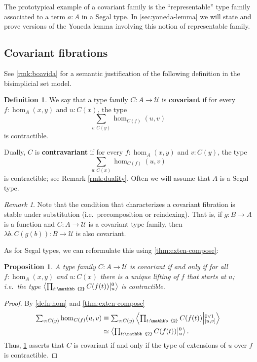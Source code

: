 \documentclass[12pt]{amsart}
\theoremstyle{plain}
\newtheorem{prop}[thm]{Proposition}
\theoremstyle{definition}
\newtheorem{defn}[thm]{Definition}
\theoremstyle{remark}
\newtheorem{rmk}[thm]{Remark}
\numberwithin{equation}{section}
\newcommand{\tsum}{\textstyle\sum}
\newcommand{\exten}[4]{\left\langle\mathchoice{\textstyle\prod_{#1}}{\textstyle\prod_{#1}}{\scriptstyle\prod_{#1}}{\scriptscriptstyle\prod_{#1}} #2 \middle|^{#3}_{#4}\right\rangle}
\newcommand{\jdeq}{\equiv}
\newcommand{\univtype}{\mathcal{U}}
\newcommand{\lam}[1]{\lambda #1.\,}
\newcommand{\two}{\mathbb{2}}
\begin{document}
The prototypical example of a covariant family is the ``representable'' type family associated to a term $a : A$ in a Segal type.
In \cref{sec:yoneda-lemma} we will state and prove versions of the Yoneda lemma involving this notion of representable family.

\subsection{Covariant fibrations}

See \cref{rmk:boavida} for a semantic justification of the following definition in the bisimplicial set model.

\begin{defn}\label{defn:covariant-family}
  We say that a type family $C:A\to\univtype$ is \textbf{covariant} if for every $f:\hom_A(x,y)$ and $u:C(x)$, the type \[\sum_{v:C(y)} \hom_{C(f)}(u,v)\] is contractible.
\end{defn}

Dually, $C$ is \textbf{contravariant} if for every $f:\hom_A(x,y)$ and $v:C(y)$, the type \[\sum_{u:C(x)} \hom_{C(f)}(u,v)\] is contractible; see Remark \ref{rmk:duality}.
Often we will assume that $A$ is a Segal type.

\begin{rmk}\label{rmk:covariant-pullbacks}
Note that the condition that characterizes a covariant fibration is stable under substitution (i.e.\ precomposition or reindexing).
That is, if $g : B \to A$ is a function and  $C : A \to \univtype$ is a covariant type family, then $\lam{b}C(g(b)) : B \to \univtype$ is also covariant.
\end{rmk}

As for Segal types, we can reformulate this using \cref{thm:exten-compose}:

\begin{prop}\label{prop:covariance-as-extension-type} A type family $C : A \to \univtype$ is covariant if and only if for all $f : \hom_A(x,y)$ and $u : C(x)$ there is a unique lifting of $f$ that starts at $u$; {i.e.\ the type 
\(\exten{t:\two}{C(f(t))}{0}{u}\)
is contractible.}
\end{prop}
\begin{proof}
By \cref{defn:hom} and \cref{thm:exten-compose}
\begin{align*}
  \tsum_{v:C(y)} \hom_{C(f)}(u,v)
  &\jdeq \tsum_{v:C(y)} \exten{t:\two}{C(f(t))}{0\lor 1}{[u,v]}\\
  &\simeq \exten{t:\two}{C(f(t))}{0}{u}.
\end{align*}
Thus, \cref{defn:covariant-family} asserts that $C$ is covariant if and only if the type of extensions of $u$ over $f$ is contractible.
\end{proof}
\end{document}
